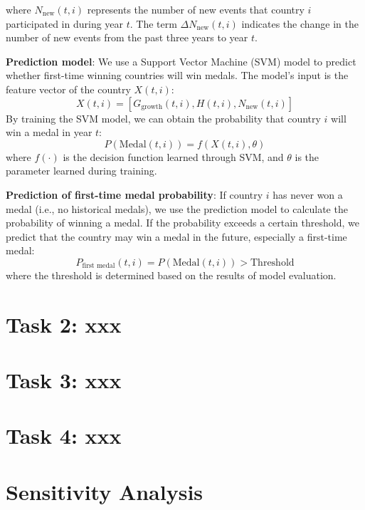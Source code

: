 \documentclass{mcmthesis}
\begin{document}
where $N_{\text{new}}(t,i)$ represents the number of new events that country $i$ participated in during year $t$. The term $\Delta N_{\text{new}}(t,i)$ indicates the change in the number of new events from the past three years to year $t$.





\textbf{Prediction model}:
We use a Support Vector Machine (SVM) model to predict whether first-time winning countries will win medals. The model’s input is the feature vector of the country $X(t,i)$:
\[
X(t,i) = [G_{\text{growth}}(t,i), H(t,i), N_{\text{new}}(t,i)]
\]
By training the SVM model, we can obtain the probability that country $i$ will win a medal in year $t$:
\[
P(\text{Medal}(t,i)) = f(X(t,i), \theta)
\]
where $f(\cdot)$ is the decision function learned through SVM, and $\theta$ is the parameter learned during training.

\textbf{Prediction of first-time medal probability}:
If country $i$ has never won a medal (i.e., no historical medals), we use the prediction model to calculate the probability of winning a medal. If the probability exceeds a certain threshold, we predict that the country may win a medal in the future, especially a first-time medal:
\[
P_{\text{first medal}}(t,i) = P(\text{Medal}(t,i)) > \text{Threshold}
\]
where the threshold is determined based on the results of model evaluation.






















\section{Task 2: xxx}

\section{Task 3: xxx}

\section{Task 4: xxx}

\section{Sensitivity Analysis}
\end{document}
